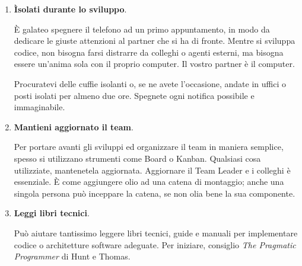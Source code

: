 \begin{enumerate}
\item \textbf{Ìsolati durante lo sviluppo}.

È galateo spegnere il telefono ad un primo appuntamento, in modo da dedicare le giuste attenzioni al partner che si ha di fronte. Mentre si sviluppa codice, non bisogna farsi distrarre da colleghi o agenti esterni, ma bisogna essere un’anima sola con il proprio computer. Il vostro partner è il computer.

Procuratevi delle cuffie isolanti o, se ne avete l’occasione, andate in uffici o posti isolati per almeno due ore. Spegnete ogni notifica possibile e immaginabile.

\item \textbf{Mantieni aggiornato il team}.

Per portare avanti gli sviluppi ed organizzare il team in maniera semplice, spesso si utilizzano strumenti come Board o Kanban. Qualsiasi cosa utilizziate, mantenetela aggiornata. Aggiornare il Team Leader e i colleghi è essenziale. È come aggiungere olio ad una catena di montaggio; anche una singola persona può inceppare la catena, se non olia bene la sua componente.

\item \textbf{Leggi libri tecnici}.

Può aiutare tantissimo leggere libri tecnici, guide e manuali per implementare codice o architetture software adeguate. Per iniziare, consiglio \emph{The Pragmatic Programmer} di Hunt e Thomas.

\end{enumerate}
